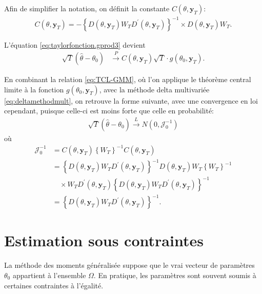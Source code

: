 Afin de simplifier la notation, on définit la constante
$C(\theta,\mathbf{y}_{T})$:
\begin{align*}
  C(\theta,\mathbf{y}_{T})=-\left\{D(\theta,\mathbf{y}_{T})W_TD^{\prime}
    (\theta,\mathbf{y}_{T}) \right\}^{-1} \times
  D(\theta,\mathbf{y}_{T})W_T.
\end{align*}

L'équation \eqref{eq:taylorfonction.gprod3} devient
\begin{align}
  \label{eq:taylorfonction.gprod4}
  \sqrt{T} \left(\hat\theta-\theta_0 \right)
  &\stackrel{P}{\longrightarrow} C(\theta,\mathbf{y}_{T})\sqrt{T}
  \cdot g(\theta_0,\mathbf{y}_{T}).
\end{align}

En combinant la relation \eqref{eq:TCL-GMM}, où l'on applique le
théorème central limite à la fonction $g(\theta_0,\mathbf{y}_{T})$,
avec la méthode delta multivariée \eqref{eq:deltamethodmult}, on
retrouve la forme suivante, avec une convergence en loi cependant,
puisque celle-ci est moins forte que celle en probabilité:
\begin{align}
  \sqrt{T} (\hat{\theta}-\theta_0) \stackrel{L}{\longrightarrow}
  N(0,\mathcal{J}_0^{-1})
\end{align}
où
\begin{align}
  \mathcal{J}_0^{-1} &=
  C(\theta,\mathbf{y}_{T})\left\{W_T\right\}^{-1}C(\theta,\mathbf{y}_{T})
  \nonumber\\
  &= \left\{D(\theta,\mathbf{y}_{T})W_TD^{\prime}
    (\theta,\mathbf{y}_{T}) \right\}^{-1} D(\theta,\mathbf{y}_{T})W_T
  \left\{W_T\right\}^{-1}\nonumber\\
  &\quad\times W_T D^{\prime}(\theta,\mathbf{y}_{T})
  \left\{D(\theta,\mathbf{y}_{T})W_TD^{\prime} (\theta,\mathbf{y}_{T})
  \right\}^{-1}\nonumber\\
  &=
  \left\{D(\theta,\mathbf{y}_{T})W_TD^{\prime}(\theta,\mathbf{y}_{T})\right\}^{-1}. \label{matricevcovparamGMMnc}
\end{align}

\section{Estimation sous contraintes}
\label{sec:estimGMMcontraint}

La méthode des moments généralisée suppose que le vrai vecteur de
paramètres $\theta_0$ appartient à l'ensemble $\Omega$. En pratique,
les paramètres sont souvent soumis à certaines contraintes à
l'égalité.

